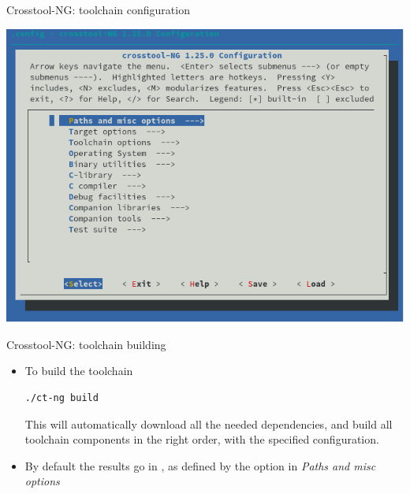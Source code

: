\begin{frame}{Crosstool-NG: toolchain configuration}
  \begin{center}
    \includegraphics[height=0.7\textheight]{slides/sysdev-toolchains-obtaining/ct-ng-menu.png}
    \vspace{0.1cm}\\
  \end{center}
\end{frame}

\begin{frame}[fragile]{Crosstool-NG: toolchain building}
  \begin{itemize}
  \item To build the toolchain
\begin{verbatim}
./ct-ng build
\end{verbatim}
    This will automatically download all the needed dependencies, and
    build all toolchain components in the right order, with the
    specified configuration.
  \item By default the results go in
    , as defined by the
    option  in {\em Paths and misc options}
  \end{itemize}
\end{frame}

